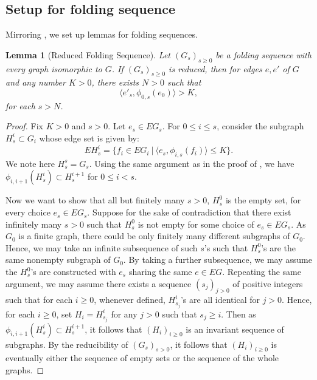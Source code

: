 \documentclass[11pt, letterpaper]{amsart}
\theoremstyle{plain}
\newtheorem{lemma}[theorem]{Lemma}
\theoremstyle{definition}
\begin{document}
\subsection{Setup for folding sequence}
\label{ssec:UBsetup_folding}
  Mirroring , we set up lemmas for folding sequences.
\begin{lemma}[Reduced Folding Sequence]\label{lem:reduced_folding}
  Let $(G_s)_{s \ge 0}$ be a folding sequence with every graph
  isomorphic to $G$. If $(G_s)_{s \ge 0}$ is reduced, then for edges $e,e'$ of $G$ and any number
  $K>0$, there exists $N>0$ such that
  \[
    \langle e'_s, \phi_{0,s}(e_0) \rangle > K, \]  for each $s > N$.
\end{lemma}

\begin{proof}
  Fix $K>0$ and $s>0$. Let $e_s \in EG_s$. For $0 \le i \le s$, consider the subgraph $H_s^i
  \subset G_i$ whose edge set is given by:
  \[
    EH_s^i = \{f_i \in EG_i\ |\ \langle e_s, \phi_{i,s}(f_i) \rangle \le K\}.
  \]
  We note here $H_s^s =G_s$. 
  Using the same argument as in the proof of , we
  have $\phi_{i,i+1}(H_s^i) \subset H_{s}^{i+1}$ for $0 \le i < s$.

  Now we want to show that all but finitely many $s>0$,
  $H_s^0$ is the empty set, for every choice $e_s \in EG_s$.
  Suppose for the sake of contradiction that there exist infinitely many $s>0$
  such that $H_s^0$ is not empty for some choice of $e_s \in EG_s$.
  As $G_0$ is a finite graph, there could be only finitely many different
  subgraphs of $G_0$. Hence, we may take an infinite subsequence of such $s$'s
  such that $H_s^0$'s are the same nonempty subgraph of $G_0$. By taking a
  further subsequence, we may assume the $H_s^0$'s are constructed with $e_s$ sharing the same
  $e \in EG$. Repeating the same argument, we may assume there exists a sequence
  $(s_j)_{j>0}$ of positive integers such that for each $i\ge 0$, whenever
  defined, $H_{s_j}^i$'s
  are all identical for $j>0$. Hence, for each $i \ge 0$, set $H_i = H_{s_j}^i$
  for any $j>0$ such that $s_j \ge i$. Then as $\phi_{i,i+1}(H_s^i) \subset
  H_s^{i+1}$, it follows that $(H_i)_{i \ge 0}$ is an invariant sequence of
  subgraphs. By the reducibility of $(G_s)_{s>0}$, it follows that $(H_i)_{i\ge
    0}$ is eventually either the sequence of empty sets or the sequence of the whole
  graphs.


\end{proof}
\end{document}
